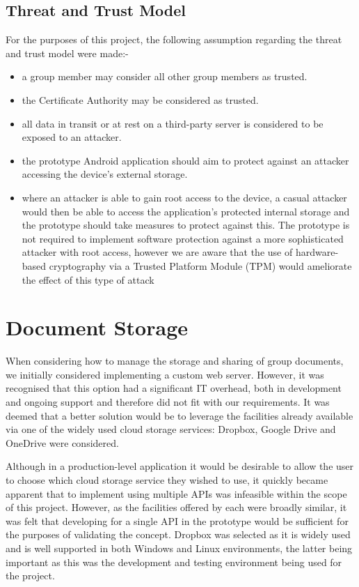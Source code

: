 \subsection*{Threat and Trust Model}
For the purposes of this project, the following assumption regarding the threat and trust model were made:-
\begin{itemize}
\item a group member may consider all other group members as trusted.
\item the Certificate Authority may be considered as trusted.  
\item all data in transit or at rest on a third-party server is considered to be exposed to an attacker.
\item the prototype Android application should aim to protect against an attacker accessing the device's external storage.  
\item  where an attacker is able to gain root access to the device, a casual attacker would then be able to access the application's protected internal storage and the prototype should take measures to protect against this.  The prototype is not required to implement software protection against a more sophisticated attacker with root access, however we are aware that the use of hardware-based cryptography via a Trusted Platform Module (TPM) would ameliorate the effect of this type of attack
\end{itemize}


\section{Document Storage}
When considering how to manage the storage and sharing of group documents, we initially considered implementing a custom web server.  However, it was recognised that this option had a significant IT overhead, both in development and ongoing support and therefore did not fit with our requirements.  It was deemed that a better solution would be to leverage the facilities already available via one of the widely used cloud storage services:  Dropbox, Google Drive and OneDrive were considered.  

Although in a production-level application it would be desirable to allow the user to choose which cloud storage service they wished to use, it quickly became apparent that to implement using multiple APIs was infeasible within the scope of this project.  However, as the facilities offered by each were broadly similar, it was felt that developing for a single API in the prototype would be sufficient for the purposes of validating the concept.  Dropbox was selected as it is widely used and is well supported in both Windows and Linux environments, the latter being important as this was the development and testing environment being used for the project.  









